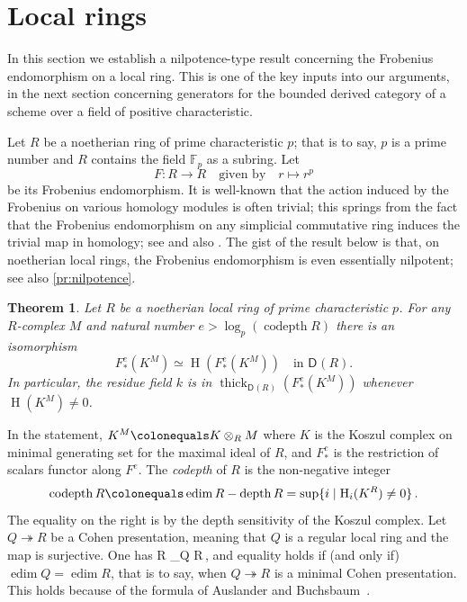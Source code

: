 \documentclass{amsart}
\let\oldequation\equation
\let\oldendequation\endequation
\renewenvironment{equation}{\linenomathNonumbers\oldequation}{\oldendequation\endlinenomath}
\newcommand{\dcat}[2][]{\cat{D}_{#1}(#2)}
\newcommand{\cat}[1]{{\mathsf{#1}}}
\newcommand{\codepth}{\operatorname{codepth}}
\newcommand{\depth}{\operatorname{depth}}
\newcommand{\edim}{\operatorname{edim}}
\newcommand{\hh}{\operatorname{H}}
\newcommand{\pdim}{\operatorname{proj\,dim}}
\newcommand{\thick}{\operatorname{thick}}
\newtheorem{theorem}[subsection]{Theorem}
\theoremstyle{definition}
\theoremstyle{remark}
\numberwithin{equation}{subsection}
\begin{document}
\section{Local rings}\label{se:nilpotence}

In this section we establish a nilpotence-type result concerning the Frobenius endomorphism on a local ring. This is one of the key inputs into our arguments, in the next section concerning generators for the bounded derived category of a scheme over a field of positive characteristic.

Let $R$ be a noetherian ring of prime characteristic $p$; that is to say, $p$ is a prime number and $R$ contains the field $\mathbb{F}_p$ as a subring. Let
\[
F\colon R\to R\quad\text{given by}\quad r\mapsto r^{p}
\]
be its Frobenius endomorphism. It is well-known that the action induced by the Frobenius on various homology modules is often trivial; this springs from the fact that the Frobenius endomorphism on any simplicial commutative ring induces the trivial map in homology; see \cite{Pirashvili:2007} and also \cite[Section~11]{Bhatt/Scholze:2017a}. The gist of the result below is that, on noetherian local rings, the Frobenius endomorphism is even essentially nilpotent; see also \cref{pr:nilpotence}.

\begin{theorem}
\label{th:nilpotence}
Let $R$ be a noetherian local ring of prime characteristic $p$. For any $R$-complex $M$ and natural number $e> \log_p(\codepth R)$ there is an isomorphism 
\[
F ^e_*(K^M) \simeq \hh(F ^e_*(K^M)) \quad\text{in $\dcat R$.}
\]
In particular, the residue field $k$ is in $\thick_{\dcat R}(F ^e_*(K^M))$ whenever $\hh(K^M)\ne 0$.
\end{theorem}

In the statement, $K^M\colonequals K\otimes_RM$ where $K$ is the Koszul complex on minimal generating set for the maximal ideal of $R$, and $F ^e_*$ is the restriction of scalars functor along $F ^e$. The \emph{codepth} of $R$ is the non-negative integer
\[
\codepth R\colonequals \edim R -\depth R=\sup\{i\mid \hh_i(K^R)\ne 0\}\,.
\]
The equality on the right is by the depth sensitivity of the Koszul complex. Let $Q\twoheadrightarrow R$ be a Cohen presentation, meaning that $Q$ is a regular local ring and the map is surjective. One has
\begin{equation}
\label{eq:codepth-pdim}
\codepth R \le \pdim_Q R\,,
\end{equation}
and equality holds if (and only if) $\edim Q=\edim R$, that is to say, when $Q\twoheadrightarrow R$ is a minimal Cohen presentation.
This holds because of the formula of Auslander and Buchsbaum~\cite[Theorem~1.3.3]{Bruns/Herzog:1998}.
\end{document}
